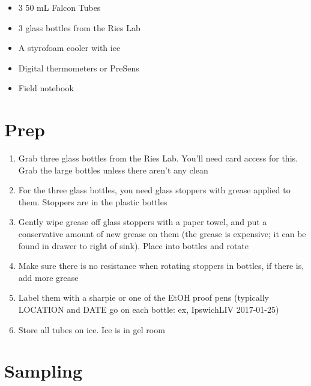 \documentclass[
  letterpaper,
  DIV=11,
  numbers=noendperiod]{scrreprt}
\begin{document}
\begin{itemize}
\item
  3 50 mL Falcon Tubes
\item
  3 glass bottles from the Ries Lab
\item
  A styrofoam cooler with ice
\item
  Digital thermometers or PreSens
\item
  Field notebook
\end{itemize}

\hypertarget{prep-1}{%
\section*{\texorpdfstring{\textbf{Prep}}{Prep}}\label{prep-1}}

\begin{enumerate}
\def\labelenumi{\arabic{enumi}.}
\item
  Grab three glass bottles from the Ries Lab. You'll need card access
  for this. Grab the large bottles unless there aren't any clean
\item
  For the three glass bottles, you need glass stoppers with grease
  applied to them. Stoppers are in the plastic bottles
\item
  Gently wipe grease off glass stoppers with a paper towel, and put a
  conservative amount of new grease on them (the grease is expensive; it
  can be found in drawer to right of sink). Place into bottles and
  rotate
\item
  Make sure there is no resistance when rotating stoppers in bottles, if
  there is, add more grease
\item
  Label them with a sharpie or one of the EtOH proof pens (typically
  LOCATION and DATE go on each bottle: ex, IpswichLIV 2017-01-25)
\item
  Store all tubes on ice. Ice is in gel room
\end{enumerate}

\hypertarget{sampling}{%
\section*{\texorpdfstring{\textbf{Sampling}}{Sampling}}\label{sampling}}
\end{document}
